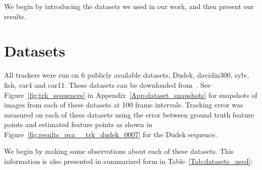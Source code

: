 We begin by introducing the datasets we used in our work, and then present our results.

\section{Datasets}
All trackers were run on 6 publicly available datasets, Dudek, davidin300, sylv, fish, car4 and car11.  These datasets can be downloaded from~\cite{2008_JNL_subspaceTRK_Ross}.  See Figure~\ref{fig:trk_sequences} in Appendix~\ref{App:dataset_snapshots} for snapshots of images from each of these datasets at 100 frame intervals.  Tracking error was measured on each of these datasets using the error between ground truth feature points and estimated feature points as shown in Figure~\ref{fig:results_pca__trk_dudek_0007} for the Dudek sequence.

We begin by making some observations about each of these datasets.  This information is also presented in summarized form in Table~\ref{Tab:datasets_used}:

